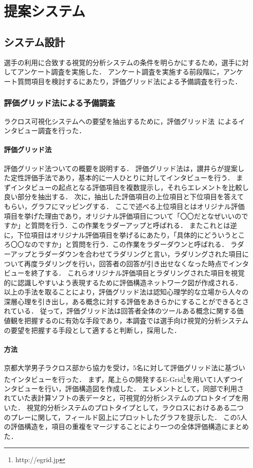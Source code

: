 \documentclass[sotsuron]{kuee}
\begin{document}
\chapter{提案システム}
	\section{システム設計}
		選手の利用に合致する視覚的分析システムの条件を明らかにするため，選手に対してアンケート調査を実施した．
		アンケート調査を実施する前段階に，アンケート質問項目を検討するにあたり，評価グリッド法による予備調査を行った．
		\subsection{評価グリッド法による予備調査}
			ラクロス可視化システムへの要望を抽出するために，評価グリッド法~\cite{EGM}によるインタビュー調査を行った．
			\subsubsection{評価グリッド法}
				評価グリッド法ついての概要を説明する．
				評価グリッド法は，讃井らが提案した定性評価手法であり，基本的に一人ひとりに対してインタビューを行う．
				まずインタビューの起点となる評価項目を複数提示し，それらエレメントを比較し良い部分を抽出する．
				次に，抽出した評価項目の上位項目と下位項目を答えてもらい，グラフにマッピングする．
				ここで述べる上位項目とはオリジナル評価項目を挙げた理由であり，オリジナル評価項目について「〇〇だとなぜいいのですか」と質問を行う．この作業をラダーアップと呼ばれる．
				またこれとは逆に，下位項目はオリジナル評価項目を挙げるにあたり，「具体的にどういうところ〇〇なのですか」と質問を行う．この作業をラダーダウンと呼ばれる．
				ラダーアップとラダーダウンを合わせてラダリングと言い，ラダリングされた項目について再度ラダリングを行い，回答者の回答が引き出せなくなった時点でインタビューを終了する．
				これらオリジナル評価項目とラダリングされた項目を視覚的に認識しやすいよう表現するために評価構造ネットワーク図が作成される．
				以上の手法を取ることにより，評価グリッド法は認知心理学的な立場から人々の深層心理を引き出し，ある概念に対する評価をあきらかにすることができるとされている．
				従って，評価グリッド法は回答者全体のツールある概念に関する価値観を把握するのに有効な手段であり，本調査では選手向け視覚的分析システムの要望を把握する手段として適すると判断し，採用した．
			\subsubsection{方法}
				京都大学男子ラクロス部から協力を受け，5名に対して評価グリッド法に基づいたインタビューを行った．
				まず，尾上らの開発するE-Grid\footnote{http://egrid.jp}を用いて1人ずつインタビューを行い，評価構造図を作成した．
				エレメントとして，同部で利用されていた表計算ソフトの表データと，可視覚的分析システムのプロトタイプを用いた．
				視覚的分析システムのプロトタイプとして，ラクロスにおけるある二つのプレーに関して，フィールド図上にプロットしたグラフを提示した．
				この5人の評価構造を，項目の重複をマージすることにより一つの全体評価構造にまとめた．
\end{document}
